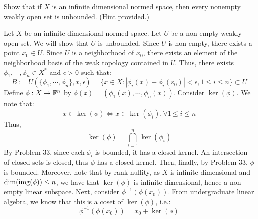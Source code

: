 \documentclass[12pt]{article}
\begin{document}
\begin{problem}{46}
    Show that if $X$ is an infinite dimensional normed space, then every nonempty weakly open set is unbounded. (Hint provided.)
\end{problem}
\begin{solution}
    Let $X$ be an infinite dimensional normed space. Let $U$ be a non-empty weakly open set. We will show that $U$ is unbounded. \bbni
    Since $U$ is non-empty, there exists a point $x_0 \in U$. Since $U$ is a neighborhood of $x_0$, there exists an element of the neighborhood basis of the weak topology contained in $U$. Thus, there exists $\phi_1, \cdots, \phi_n \in X^*$ and $\epsilon > 0$ such that:
    \[ B := U(\{\phi_1, \cdots, \phi_n\}, x, \epsilon) = \{x \in X: |\phi_i(x)-\phi_i(x_0)| < \epsilon, 1 \leq i \leq n\} \subset U \]    
    Define $\phi: X \to \mathbb F^n$ by $\phi(x) = (\phi_1(x), \cdots, \phi_n(x))$. Consider $\ker(\phi)$. We note that: 
    \[  x \in \ker(\phi) \iff x \in \ker(\phi_i), \forall 1 \leq i \leq n\]
    Thus, 
    \[ \ker(\phi) = \bigcap_{i=1}^n \ker(\phi_i)\]
    By Problem 33, since each $\phi_i$ is bounded, it has a closed kernel. An intersection of closed sets is closed, thus $\phi$ has a closed kernel. Then, finally, by Problem 33, $\phi$ is bounded. \bbni
    Moreover, note that by rank-nullity, as $X$ is infinite dimensional and $\dim(\operatorname{img}(\phi)) \leq n$, we have that $\ker(\phi)$ is infinite dimensional, hence a non-empty linear subspace. \bbni
    Next, consider $\phi^{-1}(\phi(x_0))$. From undergraduate linear algebra, we know that this is a coset of $\ker(\phi)$, i.e.:
    \[ \phi^{-1}(\phi(x_0)) = x_0 + \ker(\phi)\]

\end{solution}
\end{document}
